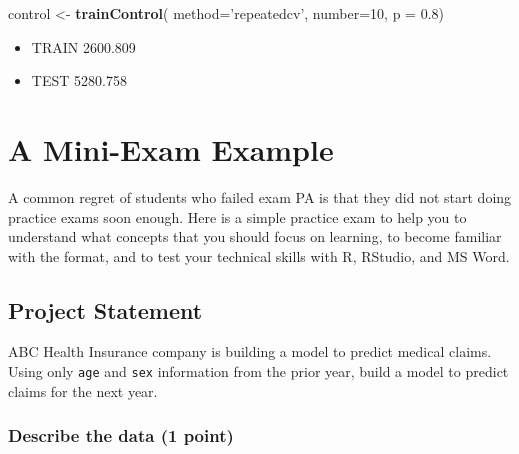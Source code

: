 \documentclass[]{book}
\newenvironment{Shaded}{\begin{snugshade}}{\end{snugshade}}
\newcommand{\CommentTok}[1]{\textcolor[rgb]{0.56,0.35,0.01}{\textit{#1}}}
\newcommand{\DataTypeTok}[1]{\textcolor[rgb]{0.13,0.29,0.53}{#1}}
\newcommand{\DecValTok}[1]{\textcolor[rgb]{0.00,0.00,0.81}{#1}}
\newcommand{\FloatTok}[1]{\textcolor[rgb]{0.00,0.00,0.81}{#1}}
\newcommand{\KeywordTok}[1]{\textcolor[rgb]{0.13,0.29,0.53}{\textbf{#1}}}
\newcommand{\NormalTok}[1]{#1}
\newcommand{\OperatorTok}[1]{\textcolor[rgb]{0.81,0.36,0.00}{\textbf{#1}}}
\newcommand{\StringTok}[1]{\textcolor[rgb]{0.31,0.60,0.02}{#1}}
\providecommand{\tightlist}{%
  \setlength{\itemsep}{0pt}\setlength{\parskip}{0pt}}
\begin{document}
\begin{Shaded}
\begin{Highlighting}[]
\NormalTok{control <-}\StringTok{ }\KeywordTok{trainControl}\NormalTok{(}
  \DataTypeTok{method=}\StringTok{'repeatedcv'}\NormalTok{, }
  \DataTypeTok{number=}\DecValTok{10}\NormalTok{, }
  \DataTypeTok{p =} \FloatTok{0.8}\NormalTok{)}
\end{Highlighting}
\end{Shaded}

\begin{itemize}
\tightlist
\item
  TRAIN 2600.809
\item
  TEST 5280.758
\end{itemize}

\hypertarget{a-mini-exam-example}{%
\chapter{A Mini-Exam Example}\label{a-mini-exam-example}}

A common regret of students who failed exam PA is that they did not start doing practice exams soon enough. Here is a simple practice exam to help you to understand what concepts that you should focus on learning, to become familiar with the format, and to test your technical skills with R, RStudio, and MS Word.

\hypertarget{project-statement}{%
\section{Project Statement}\label{project-statement}}

ABC Health Insurance company is building a model to predict medical claims. Using only \texttt{age} and \texttt{sex} information from the prior year, build a model to predict claims for the next year.

\hypertarget{describe-the-data-1-point}{%
\subsection{Describe the data (1 point)}\label{describe-the-data-1-point}}

\begin{Shaded}
\end{Shaded}
\end{document}
